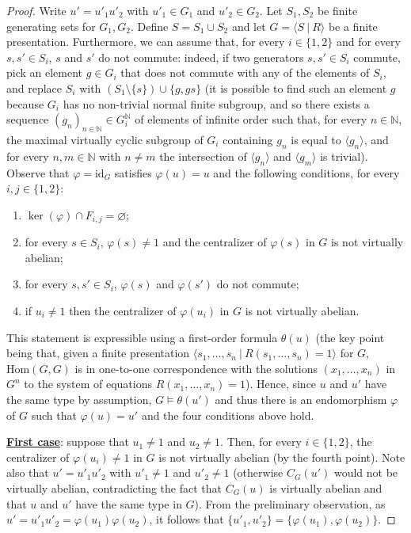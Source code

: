 \documentclass[a4paper, 11pt]{amsart}
\theoremstyle{definition}
\theoremstyle{remark}
\begin{document}
\begin{proof}
\smallskip \noindent
Write $u'=u'_1u'_2$ with $u'_1\in G_1$ and $u'_2\in G_2$. Let $S_1, S_2$ be finite generating sets for $G_1,G_2$. Define $S=S_1\cup S_2$ and let $G=\langle S \ \vert \ R\rangle$ be a finite presentation. Furthermore, we can assume that, for every $i\in\lbrace 1,2\rbrace$ and for every $s,s'\in S_i$, $s$ and $s'$ do not commute: indeed, if two generators $s,s'\in S_i$ commute, pick an element $g\in G_i$ that does not commute with any of the elements of $S_i$, and replace $S_i$ with $(S_1\setminus \lbrace s\rbrace)\cup \lbrace g,gs\rbrace$ (it is possible to find such an element $g$ because $G_i$ has no non-trivial normal finite subgroup, and so there exists a sequence $(g_n)_{n\in \mathbb{N}}\in G_i^{\mathbb{N}}$ of elements of infinite order such that, for every $n\in\mathbb{N}$, the maximal virtually cyclic subgroup of $G_i$ containing $g_n$ is equal to $\langle g_n\rangle$, and for every $n,m\in\mathbb{N}$ with $n\neq m$ the intersection of $\langle g_n\rangle$ and $\langle g_m\rangle$ is trivial). Observe that $\varphi=\mathrm{id}_G$ satisfies $\varphi(u)=u$ and the following conditions, for every $i,j\in\lbrace 1,2\rbrace$:
\begin{enumerate}[(1)]
    \item $\ker(\varphi)\cap F_{i,j}=\varnothing$;
    \item for every $s\in S_i$, 
    $\varphi(s)\neq 1$ and the centralizer of $\varphi(s)$ in $G$ is not virtually abelian;
    \item for every $s,s'\in S_i$, $\varphi(s)$ and $\varphi(s')$ do not commute;
    \item if $u_i\neq 1$ then the centralizer of $\varphi(u_i)$ in $G$ is not virtually abelian.
\end{enumerate}
This statement is expressible using a first-order formula $\theta(u)$ (the key point being that, given a finite presentation $\langle s_1,\ldots ,s_n \ \vert \ R(s_1,\ldots,s_n)=1\rangle$ for $G$, $\mathrm{Hom}(G,G)$ is in one-to-one correspondence with the solutions $(x_1,\ldots,x_n)$ in $G^n$ to the system of equations $R(x_1,\ldots,x_n)=1$). Hence, since $u$ and $u'$ have the same type by assumption, $G\models\theta(u')$ and thus there is an endomorphism $\varphi$ of $G$ such that $\varphi(u)=u'$ and the four conditions above hold.

\smallskip \noindent
\underline{\textbf{First case}}: suppose that $u_1\neq 1$ and $u_2\neq 1$. Then, for every $i\in\lbrace 1,2\rbrace$, the centralizer of $\varphi(u_i)\neq 1$ in $G$ is not virtually abelian (by the fourth point). Note also that $u'=u'_1u'_2$ with $u'_1\neq 1$ and $u'_2\neq 1$ (otherwise $C_G(u')$ would not be virtually abelian, contradicting the fact that $C_G(u)$ is virtually abelian and that $u$ and $u'$ have the same type in $G$). From the preliminary observation, as $u'=u'_1u'_2=\varphi(u_1)\varphi(u_2)$, it follows that $\lbrace u'_1,u'_2\rbrace=\lbrace \varphi(u_1),\varphi(u_2)\rbrace$. 


\end{proof}
\end{document}
